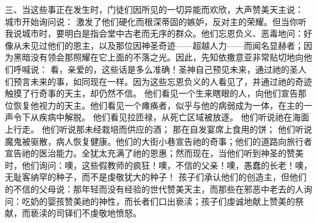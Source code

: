 三、当这些事正在发生时，门徒们因所见的一切异能而欢欣，大声赞美天主说： 城市开始询问说： 激发了他们硬化而根深蒂固的嫉妒，反对主的荣耀。但当你听我说城市时，要明白是指会堂中古老而无序的群众。他们忘恩负义、恶毒地问：好像从未见过他们的恩主，以及那位因神圣奇迹——超越人力——而闻名显赫者；因为黑暗没有领会那照耀在它上面的不落之光。因此，先知依撒意亚非常贴切地向他们呼喊说： 看，亲爱的，这些话是多么准确！圣神自己预见未来，通过祂的圣人们预言未来的事，如同现在一样。因为这些忘恩负义的人看见了，并通过祂的奇迹触摸了行奇事的天主，却仍然不信。 他们看见一个生来瞎眼的人，向他们宣告那位恢复他视力的天主。他们看见一个瘫痪者，似乎与他的病弱成为一体，在主的一声令下从疾病中解脱。 他们看见拉匝禄，从死亡区域被放逐。 他们听说祂在海面上行走。 他们听说那未经栽培而供应的酒； 那在自发宴席上食用的饼； 他们听说魔鬼被驱散，病人恢复健康。他们的大街小巷宣告祂的奇事；他们的道路向旅行者宣告祂的医治能力。全犹太充满了祂的恩惠；然而现在，当他们听到神圣的赞美时，他们询问：噢，这些假教师的疯狂！噢，不信的父亲！噢，愚蠢的长老！噢，无耻客纳罕的种子，而不是虔敬犹大的种子！ 孩子们承认他们的创造主，但他们的不信的父母说：那年轻而没有经验的世代赞美天主，而那些在邪恶中老去的人询问：吃奶的婴孩赞美祂的神性，而长者们口出亵渎；孩子们虔诚地献上赞美的祭献，而亵渎的司铎们不虔敬地愤怒。\par

